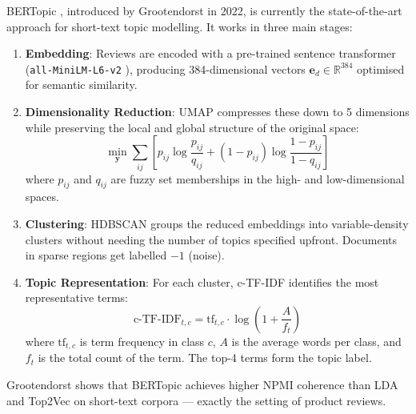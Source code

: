 \begin{justify}
BERTopic \cite{grootendorst2022bertopic}, introduced by Grootendorst in 2022, is currently the state-of-the-art approach for short-text topic modelling. It works in three main stages:

\begin{enumerate}
    \item \textbf{Embedding}: Reviews are encoded with a pre-trained sentence transformer (\texttt{all-MiniLM-L6-v2} \cite{reimers2019sentencebert}), producing 384-dimensional vectors $\mathbf{e}_d \in \mathbb{R}^{384}$ optimised for semantic similarity.

    \item \textbf{Dimensionality Reduction}: UMAP \cite{mcinnes2018umap} compresses these down to 5 dimensions while preserving the local and global structure of the original space:
    \begin{equation}
        \min_{\mathbf{y}} \sum_{ij} \left[ p_{ij} \log \frac{p_{ij}}{q_{ij}} + (1-p_{ij})\log\frac{1-p_{ij}}{1-q_{ij}} \right]
    \end{equation}
    where $p_{ij}$ and $q_{ij}$ are fuzzy set memberships in the high- and low-dimensional spaces.

    \item \textbf{Clustering}: HDBSCAN \cite{campello2013density} groups the reduced embeddings into variable-density clusters without needing the number of topics specified upfront. Documents in sparse regions get labelled $-1$ (noise).

    \item \textbf{Topic Representation}: For each cluster, c-TF-IDF identifies the most representative terms:
    \begin{equation}
        \text{c-TF-IDF}_{t,c} = \text{tf}_{t,c} \cdot \log\left(1 + \frac{A}{f_t}\right)
    \end{equation}
    where $\text{tf}_{t,c}$ is term frequency in class $c$, $A$ is the average words per class, and $f_t$ is the total count of the term. The top-4 terms form the topic label.
\end{enumerate}

Grootendorst shows that BERTopic achieves higher NPMI coherence than LDA and Top2Vec on short-text corpora — exactly the setting of product reviews.
\end{justify}

